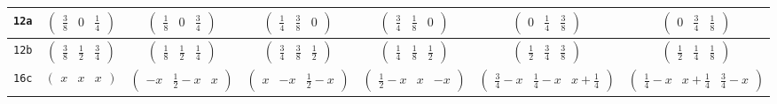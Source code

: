\documentclass[fleqn,9pt,landscape]{jsarticle}
\begin{document}
\begin{center}
\begin{longtable}{ccccccc}
{\tt 12a} & $ \begin{pmatrix} \frac{3}{8} & 0 & \frac{1}{4} \end{pmatrix} $ & $ \begin{pmatrix} \frac{1}{8} & 0 & \frac{3}{4} \end{pmatrix} $ & $ \begin{pmatrix} \frac{1}{4} & \frac{3}{8} & 0 \end{pmatrix} $ & $ \begin{pmatrix} \frac{3}{4} & \frac{1}{8} & 0 \end{pmatrix} $ & $ \begin{pmatrix} 0 & \frac{1}{4} & \frac{3}{8} \end{pmatrix} $ & $ \begin{pmatrix} 0 & \frac{3}{4} & \frac{1}{8} \end{pmatrix} $ \\ \hline
{\tt 12b} & $ \begin{pmatrix} \frac{3}{8} & \frac{1}{2} & \frac{3}{4} \end{pmatrix} $ & $ \begin{pmatrix} \frac{1}{8} & \frac{1}{2} & \frac{1}{4} \end{pmatrix} $ & $ \begin{pmatrix} \frac{3}{4} & \frac{3}{8} & \frac{1}{2} \end{pmatrix} $ & $ \begin{pmatrix} \frac{1}{4} & \frac{1}{8} & \frac{1}{2} \end{pmatrix} $ & $ \begin{pmatrix} \frac{1}{2} & \frac{3}{4} & \frac{3}{8} \end{pmatrix} $ & $ \begin{pmatrix} \frac{1}{2} & \frac{1}{4} & \frac{1}{8} \end{pmatrix} $ \\ \hline
{\tt 16c} & $ \begin{pmatrix} x & x & x \end{pmatrix} $ & $ \begin{pmatrix} - x & \frac{1}{2} - x & x \end{pmatrix} $ & $ \begin{pmatrix} x & - x & \frac{1}{2} - x \end{pmatrix} $ & $ \begin{pmatrix} \frac{1}{2} - x & x & - x \end{pmatrix} $ & $ \begin{pmatrix} \frac{3}{4} - x & \frac{1}{4} - x & x + \frac{1}{4} \end{pmatrix} $ & $ \begin{pmatrix} \frac{1}{4} - x & x + \frac{1}{4} & \frac{3}{4} - x \end{pmatrix} $ \\

\end{longtable}
\end{center}
\end{document}
